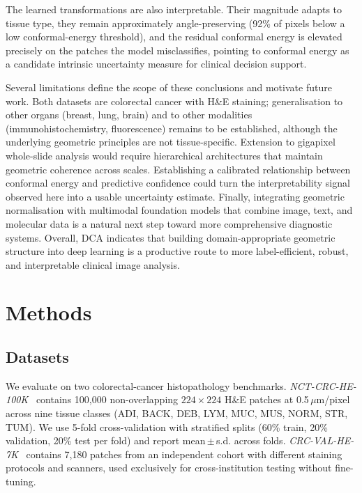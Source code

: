 \documentclass[pdflatex,sn-nature]{sn-jnl}%
\theoremstyle{thmstyleone}%
\theoremstyle{thmstyletwo}%
\theoremstyle{thmstylethree}%
\begin{document}
The learned transformations are also interpretable. Their magnitude adapts to
tissue type, they remain approximately angle-preserving (92\% of pixels below a
low conformal-energy threshold), and the residual conformal energy is elevated
precisely on the patches the model misclassifies, pointing to conformal energy as
a candidate intrinsic uncertainty measure for clinical decision support.

Several limitations define the scope of these conclusions and motivate future
work. Both datasets are colorectal cancer with H\&E staining; generalisation to
other organs (breast, lung, brain) and to other modalities (immunohistochemistry,
fluorescence) remains to be established, although the underlying geometric
principles are not tissue-specific. Extension to gigapixel whole-slide analysis
would require hierarchical architectures that maintain geometric coherence across
scales. Establishing a calibrated relationship between conformal energy and
predictive confidence could turn the interpretability signal observed here into a
usable uncertainty estimate. Finally, integrating geometric normalisation with
multimodal foundation models that combine image, text, and molecular data is a
natural next step toward more comprehensive diagnostic systems. Overall, DCA
indicates that building domain-appropriate geometric structure into deep learning
is a productive route to more label-efficient, robust, and interpretable clinical
image analysis.

\section{Methods}
\label{sec:method}

\subsection{Datasets}

We evaluate on two colorectal-cancer histopathology benchmarks.
\textit{NCT-CRC-HE-100K}~\cite{nct_dataset} contains 100{,}000 non-overlapping
$224\times224$ H\&E patches at 0.5\,$\mu$m/pixel across nine tissue classes
(ADI, BACK, DEB, LYM, MUC, MUS, NORM, STR, TUM). We use 5-fold cross-validation
with stratified splits (60\% train, 20\% validation, 20\% test per fold) and
report mean\,$\pm$\,s.d. across folds. \textit{CRC-VAL-HE-7K}~\cite{nct_dataset}
contains 7{,}180 patches from an independent cohort with different staining
protocols and scanners, used exclusively for cross-institution testing without
fine-tuning.
\end{document}
